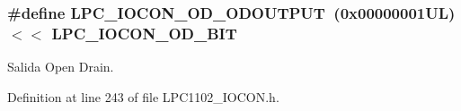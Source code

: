 \subsubsection[{\texorpdfstring{L\+P\+C\+\_\+\+I\+O\+C\+O\+N\+\_\+\+O\+D\+\_\+\+O\+D\+O\+U\+T\+P\+UT}{LPC_IOCON_OD_ODOUTPUT}}]{\setlength{\rightskip}{0pt plus 5cm}\#define L\+P\+C\+\_\+\+I\+O\+C\+O\+N\+\_\+\+O\+D\+\_\+\+O\+D\+O\+U\+T\+P\+UT~(0x00000001\+U\+L) $<$$<$ L\+P\+C\+\_\+\+I\+O\+C\+O\+N\+\_\+\+O\+D\+\_\+\+B\+IT}\hypertarget{group___l_p_c___i_o_c_o_n___l_p_c1102___h_y_s___o_d_ga78db812d9390dabe4c8fe7d68fc0013f}{}\label{group___l_p_c___i_o_c_o_n___l_p_c1102___h_y_s___o_d_ga78db812d9390dabe4c8fe7d68fc0013f}


Salida Open Drain. 



Definition at line 243 of file L\+P\+C1102\+\_\+\+I\+O\+C\+O\+N.\+h.

